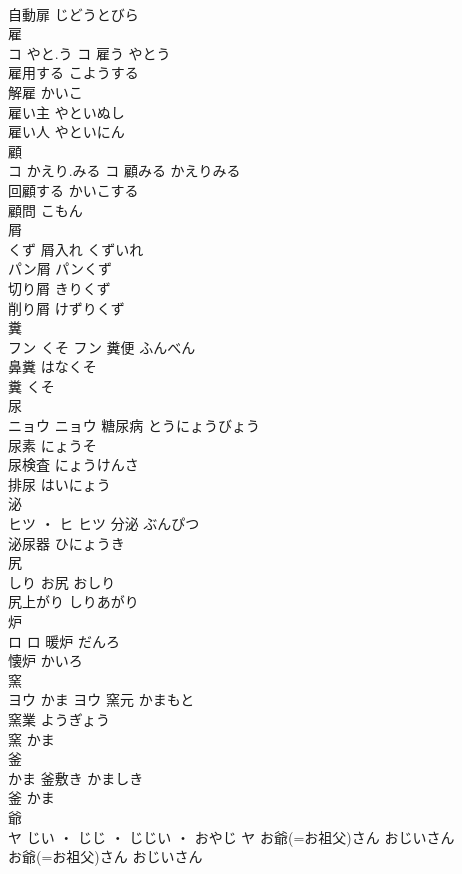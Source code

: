 \documentclass[8pt]{extreport}
\begin{document}
\begin{CJK}{UTF8}{min}
\\	自動扉	じどうとびら	
\\	雇	
\\	コ	やと.う	コ	雇う	やとう	
\\	雇用する	こようする	
\\	解雇	かいこ	
\\	雇い主	やといぬし	
\\	雇い人	やといにん	
\\	顧	
\\	コ	かえり.みる	コ	顧みる	かえりみる	
\\	回顧する	かいこする	
\\	顧問	こもん	
\\	屑	
\\	くず		屑入れ	くずいれ	
\\	パン屑	パンくず	
\\	切り屑	きりくず	
\\	削り屑	けずりくず	
\\	糞	
\\	フン	くそ	フン	糞便	ふんべん	
\\	鼻糞	はなくそ	
\\	糞	くそ	
\\	尿	
\\	ニョウ		ニョウ	糖尿病	とうにょうびょう	
\\	尿素	にょうそ	
\\	尿検査	にょうけんさ	
\\	排尿	はいにょう	
\\	泌	
\\	ヒツ ・ ヒ		ヒツ	分泌	ぶんぴつ	
\\	泌尿器	ひにょうき	
\\	尻	
\\	しり		お尻	おしり	
\\	尻上がり	しりあがり	
\\	炉	
\\	ロ		ロ	暖炉	だんろ	
\\	懐炉	かいろ	
\\	窯	
\\	ヨウ	かま	ヨウ	窯元	かまもと	
\\	窯業	ようぎょう	
\\	窯	かま	
\\	釜	
\\	かま		釜敷き	かましき	
\\	釜	かま	
\\	爺	
\\	ヤ	じい ・ じじ ・ じじい ・ おやじ	ヤ	お爺(=お祖父)さん	おじいさん	
\\	お爺(=お祖父)さん	おじいさん	

\end{CJK}
\end{document}
